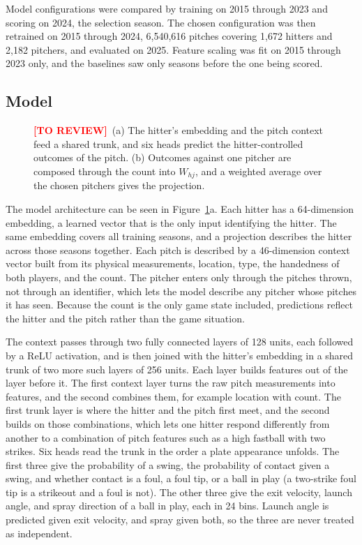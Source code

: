 \documentclass[11pt,letterpaper]{article}
\newcommand{\toreview}{\textcolor{red}{\textbf{[TO REVIEW]}}~}
\let\oldsubsection\subsection
\renewcommand\subsection{\FloatBarrier\oldsubsection}
\begin{document}
Model configurations were compared by training on 2015 through 2023 and scoring on 2024, the selection season. The chosen configuration was then retrained on 2015 through 2024, 6,540,616 pitches covering 1,672 hitters and 2,182 pitchers, and evaluated on 2025. Feature scaling was fit on 2015 through 2023 only, and the baselines saw only seasons before the one being scored.

\subsection{Model}
\label{sec:model}

\begin{figure}[!ht]
\centering

\caption{\toreview (a) The hitter's embedding and the pitch context feed a shared trunk, and six heads predict the hitter-controlled outcomes of the pitch. (b) Outcomes against one pitcher are composed through the count into $W_{hj}$, and a weighted average over the chosen pitchers gives the projection.}
\label{fig:arch}
\end{figure}

The model architecture can be seen in Figure~\ref{fig:arch}a. Each hitter has a 64-dimension embedding, a learned vector that is the only input identifying the hitter. The same embedding covers all training seasons, and a projection describes the hitter across those seasons together. Each pitch is described by a 46-dimension context vector built from its physical measurements, location, type, the handedness of both players, and the count. The pitcher enters only through the pitches thrown, not through an identifier, which lets the model describe any pitcher whose pitches it has seen. Because the count is the only game state included, predictions reflect the hitter and the pitch rather than the game situation.

The context passes through two fully connected layers of 128 units, each followed by a ReLU activation, and is then joined with the hitter's embedding in a shared trunk of two more such layers of 256 units. Each layer builds features out of the layer before it. The first context layer turns the raw pitch measurements into features, and the second combines them, for example location with count. The first trunk layer is where the hitter and the pitch first meet, and the second builds on those combinations, which lets one hitter respond differently from another to a combination of pitch features such as a high fastball with two strikes. Six heads read the trunk in the order a plate appearance unfolds. The first three give the probability of a swing, the probability of contact given a swing, and whether contact is a foul, a foul tip, or a ball in play (a two-strike foul tip is a strikeout and a foul is not). The other three give the exit velocity, launch angle, and spray direction of a ball in play, each in 24 bins. Launch angle is predicted given exit velocity, and spray given both, so the three are never treated as independent.
\end{document}
